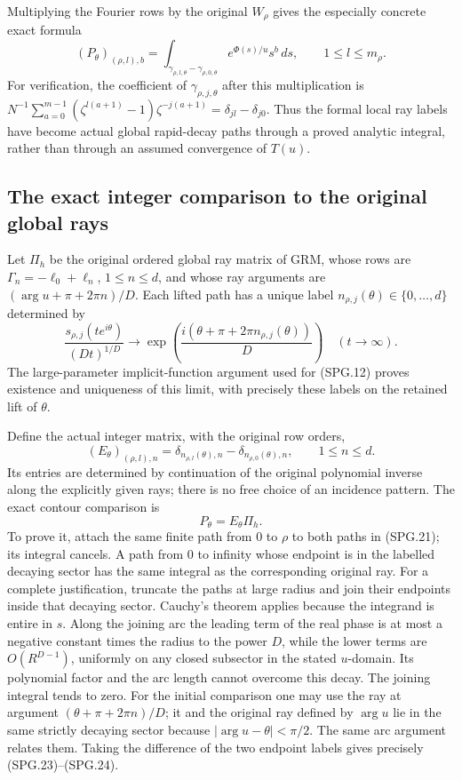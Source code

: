 Multiplying the Fourier rows by the original \(W_\rho\) gives
the especially concrete exact formula
\[
 (P_\theta)_{(\rho,l),b}
    =\int_{\gamma_{\rho,l,\theta}-\gamma_{\rho,0,\theta}}
             e^{\Phi(s)/u}s^b\,ds,
       \qquad 1\le l\le m_\rho.
 \tag{SPG.21}\label{eq:spg-actual-local-cycles}
\]
For verification, the coefficient of \(\gamma_{\rho,j,\theta}\)
after this multiplication is
\(N^{-1}\sum_{a=0}^{m-1}
(\zeta^{l(a+1)}-1)\zeta^{-j(a+1)}
=\delta_{jl}-\delta_{j0}\).
Thus the formal local ray labels have become actual global
rapid-decay paths through a proved analytic integral, rather than
through an assumed convergence of \(T(u)\).

\subsection{The exact integer comparison to the original global rays}

Let \(\Pi_h\) be the original ordered global ray matrix of GRM,
whose rows are \(\Gamma_n=-\ell_0+\ell_n\), \(1\le n\le d\),
and whose ray arguments are
\((\arg u+\pi+2\pi n)/D\). Each lifted path has a unique
label \(n_{\rho,j}(\theta)\in\{0,\ldots,d\}\) determined by
\[
 \frac{s_{\rho,j}(t e^{i\theta})}{(Dt)^{1/D}}
    \longrightarrow
        \exp\left(\frac{i(\theta+\pi+2\pi n_{\rho,j}(\theta))}{D}\right)
                    \quad(t\longrightarrow\infty).
 \tag{SPG.22}\label{eq:spg-end-label}
\]
The large-parameter implicit-function argument used for (SPG.12)
proves existence and uniqueness of this limit, with precisely these
labels on the retained lift of \(\theta\).

Define the actual integer matrix, with the original row orders,
\[
 (E_\theta)_{(\rho,l),n}
    =\delta_{n_{\rho,l}(\theta),n}
                    -\delta_{n_{\rho,0}(\theta),n},
 \qquad 1\le n\le d.
 \tag{SPG.23}\label{eq:spg-incidence}
\]
Its entries are determined by continuation of the original polynomial
inverse along the explicitly given rays; there is no free choice of
an incidence pattern. The exact contour comparison is
\[
                    P_\theta=E_\theta\Pi_h.
 \tag{SPG.24}\label{eq:spg-global-comparison}
\]
To prove it, attach the same finite path from \(0\) to \(\rho\)
to both paths in (SPG.21); its integral cancels. A path from \(0\)
to infinity whose endpoint is in the labelled decaying sector has
the same integral as the corresponding original ray. For a complete
justification, truncate the paths at large radius and join their
endpoints inside that decaying sector. Cauchy's theorem applies
because the integrand is entire in \(s\). Along the joining arc
the leading term of the real phase is at most a negative constant
times the radius to the power \(D\), while the lower terms are
\(O(R^{D-1})\), uniformly on any closed subsector in the stated
\(u\)-domain. Its polynomial factor and the arc length cannot
overcome this decay. The joining integral tends to zero. For the
initial comparison one may use the ray at argument
\((\theta+\pi+2\pi n)/D\); it and the original ray defined by
\(\arg u\) lie in the same strictly decaying sector because
\(|\arg u-\theta|<\pi/2\). The same arc argument relates them.
Taking the difference of the two endpoint labels gives precisely
(SPG.23)--(SPG.24).

